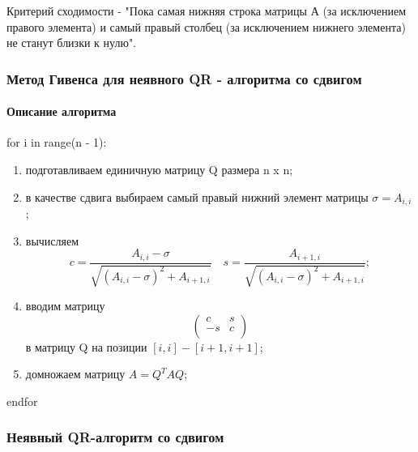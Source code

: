 \documentclass[a4paper]{article}
\begin{document}
Критерий сходимости - "Пока самая нижняя строка матрицы А (за исключением правого элемента) и самый правый столбец (за исключением нижнего элемента) не станут близки к нулю".



\newpage

\subsubsection{Метод Гивенса для неявного QR - алгоритма со сдвигом}

\paragraph{Описание алгоритма}

for i in range(n - 1):

\begin{enumerate}
\item подготавливаем единичную матрицу Q размера n x n;
\item в качестве сдвига выбираем самый правый нижний элемент матрицы $\sigma = A_{i, i}$;
\item вычисляем
\begin{equation*}
c = \dfrac{A_{i, i} - \sigma}{\sqrt{(A_{i, i} - \sigma)^2 + A_{i + 1, i}}} \quad
s = \dfrac{A_{i + 1, i}}{\sqrt{(A_{i, i} - \sigma)^2 + A_{i + 1, i}}};
\end{equation*}
\item вводим матрицу 
\begin{equation*}
\begin{pmatrix}
c & s \\
-s & c \\
\end{pmatrix}
\end{equation*}
в матрицу Q на позиции $[i, i] - [i + 1, i + 1]$;
\item домножаем матрицу $A = Q^T A Q$;
\end{enumerate}
endfor



\newpage

\subsubsection{Неявный QR-алгоритм со сдвигом}
\end{document}
